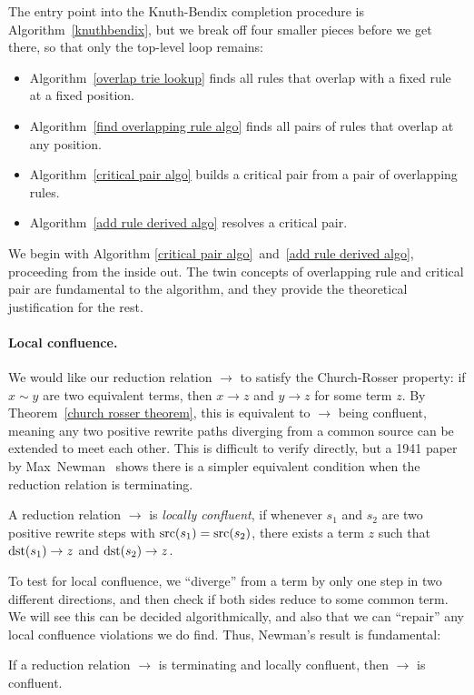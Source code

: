 \documentclass[../generics]{subfiles}
\begin{document}
The entry point into the Knuth-Bendix completion procedure is Algorithm~\ref{knuthbendix}, but we break off four smaller pieces before we get there, so that only the top-level loop remains:
\begin{itemize}
\item Algorithm~\ref{overlap trie lookup} finds all rules that overlap with a fixed rule at a fixed position.
\item Algorithm~\ref{find overlapping rule algo} finds all pairs of rules that overlap at any position.
\item Algorithm~\ref{critical pair algo} builds a critical pair from a pair of overlapping rules.
\item Algorithm~\ref{add rule derived algo} resolves a critical pair.
\end{itemize}
We begin with Algorithm \ref{critical pair algo}~and~\ref{add rule derived algo}, proceeding from the inside out. The twin concepts of overlapping rule and critical pair are fundamental to the algorithm, and they provide the theoretical justification for the rest.

\paragraph{Local confluence.} We would like our reduction relation $\rightarrow$ to satisfy the Church-Rosser property: if $x\sim y$ are two equivalent terms, then $x\rightarrow z$ and $y\rightarrow z$ for some term $z$. By Theorem~\ref{church rosser theorem}, this is equivalent to $\rightarrow$ being confluent, meaning any two positive rewrite paths diverging from a common source can be extended to meet each other. This is difficult to verify directly, but a 1941 paper by Max~Newman~\cite{newman} shows there is a simpler equivalent condition when the reduction relation is terminating.
\begin{definition}
A reduction relation $\rightarrow$ is \emph{locally confluent}, if whenever $s_1$ and $s_2$ are two positive rewrite steps with $\operatorname{src}(s_1)=\operatorname{src}(s_2)$, there exists a term $z$ such that $\operatorname{dst}(s_1)\rightarrow z$ and $\operatorname{dst}(s_2)\rightarrow z$.
\end{definition}
To test for local confluence, we ``diverge'' from a term by only one step in two different directions, and then check if both sides reduce to some common term. We will see this can be decided algorithmically, and also that we can ``repair'' any local confluence violations we do find. Thus, Newman's result is fundamental:
\begin{theorem}
If a reduction relation $\rightarrow$ is terminating and locally confluent, then $\rightarrow$ is confluent.
\end{theorem}
\end{document}
